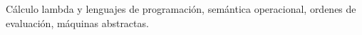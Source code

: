 Cálculo lambda y lenguajes de programación, semántica operacional, ordenes de
evaluación, máquinas abstractas.

